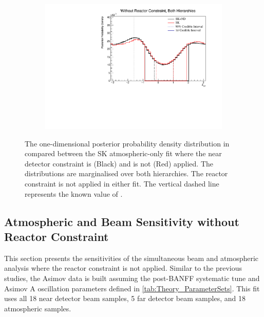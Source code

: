 \begin{figure}[h]
  \begin{subfigure}[t]{0.98\textwidth}
    \includegraphics[width=\textwidth, trim={0mm 0mm 0mm 0mm}, clip,page=1]{Figures/OA/SKOnlyFit_noND/ContourComparison_1D_dcp_BH_2_woRC_UnSmeared_CredibleInterval.pdf}
  \end{subfigure}
  \caption{The one-dimensional posterior probability density distribution in  compared between the SK atmospheric-only fit where the near detector constraint is (Black) and is not (Red) applied. The distributions are marginalised over both hierarchies. The reactor constraint is not applied in either fit. The vertical dashed line represents the known value of .}
  \label{fig:OscillationAnalysis_SKOnly_NoND_DCP}
\end{figure}

\clearpage
\subsection{Atmospheric and Beam Sensitivity without Reactor Constraint}
\label{sec:OscillationAnalysis_JointFit}

This section presents the sensitivities of the simultaneous beam and atmospheric analysis where the reactor constraint is not applied. Similar to the previous studies, the Asimov data is built assuming the post-BANFF systematic tune and Asimov A oscillation parameters defined in \autoref{tab:Theory_ParameterSets}. This fit uses all 18 near detector beam samples, 5 far detector beam samples, and 18 atmospheric samples. 


